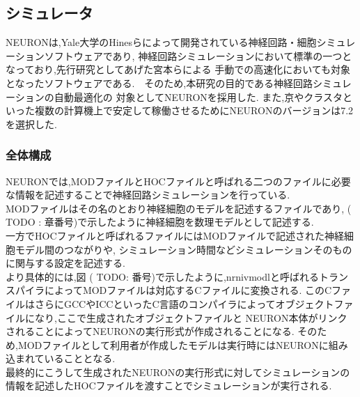 \subsection{シミュレータ}
NEURONは,Yale大学のHinesらによって開発されている神経回路・細胞シミュレーションソフトウェアであり,
神経回路シミュレーションにおいて標準の一つとなっており,先行研究としてあげた宮本らによる
手動での高速化においても対象となったソフトウェアである.　そのため,本研究の目的である神経回路シミュレーションの自動最適化の
対象としてNEURONを採用した. また,京やクラスタといった複数の計算機上で安定して稼働させるためにNEURONのバージョンは7.2を選択した.\\

\subsubsection{全体構成}
NEURONでは,MODファイルとHOCファイルと呼ばれる二つのファイルに必要な情報を記述することで神経回路シミュレーションを行っている.\\
MODファイルはその名のとおり神経細胞のモデルを記述するファイルであり, ( TODO : 章番号)で示したように神経細胞を数理モデルとして記述する.\\
一方でHOCファイルと呼ばれるファイルにはMODファイルで記述された神経細胞モデル間のつながりや,
シミュレーション時間などシミュレーションそのものに関与する設定を記述する.\\
より具体的には,図 ( TODO: 番号)で示したように,nrnivmodlと呼ばれるトランスパイラによってMODファイルは対応するCファイルに変換される.
このCファイルはさらにGCCやICCといったC言語のコンパイラによってオブジェクトファイルになり,ここで生成されたオブジェクトファイルと
NEURON本体がリンクされることによってNEURONの実行形式が作成されることになる.
そのため,MODファイルとして利用者が作成したモデルは実行時にはNEURONに組み込まれていることとなる.\\
最終的にこうして生成されたNEURONの実行形式に対してシミュレーションの情報を記述したHOCファイルを渡すことでシミュレーションが実行される.\\
